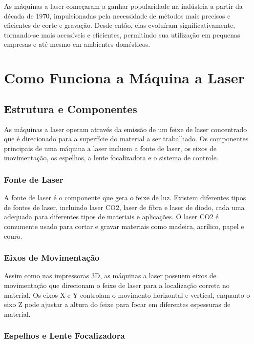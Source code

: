 \documentclass[
]{book}
\begin{document}
As máquinas a laser começaram a ganhar popularidade na indústria a partir da década de 1970, impulsionadas pela necessidade de métodos mais precisos e eficientes de corte e gravação. Desde então, elas evoluíram significativamente, tornando-se mais acessíveis e eficientes, permitindo sua utilização em pequenas empresas e até mesmo em ambientes domésticos.

\section{Como Funciona a Máquina a Laser}\label{como-funciona-a-muxe1quina-a-laser}

\subsection{Estrutura e Componentes}\label{estrutura-e-componentes-1}

As máquinas a laser operam através da emissão de um feixe de laser concentrado que é direcionado para a superfície do material a ser trabalhado. Os componentes principais de uma máquina a laser incluem a fonte de laser, os eixos de movimentação, os espelhos, a lente focalizadora e o sistema de controle.

\subsubsection{Fonte de Laser}\label{fonte-de-laser}

A fonte de laser é o componente que gera o feixe de luz. Existem diferentes tipos de fontes de laser, incluindo laser CO2, laser de fibra e laser de diodo, cada uma adequada para diferentes tipos de materiais e aplicações. O laser CO2 é comumente usado para cortar e gravar materiais como madeira, acrílico, papel e couro.

\subsubsection{Eixos de Movimentação}\label{eixos-de-movimentauxe7uxe3o}

Assim como nas impressoras 3D, as máquinas a laser possuem eixos de movimentação que direcionam o feixe de laser para a localização correta no material. Os eixos X e Y controlam o movimento horizontal e vertical, enquanto o eixo Z pode ajustar a altura do feixe para focar em diferentes espessuras de material.

\subsubsection{Espelhos e Lente Focalizadora}\label{espelhos-e-lente-focalizadora}
\end{document}
